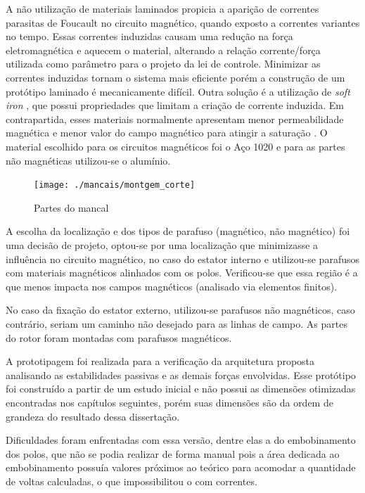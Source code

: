  
A não utilização de materiais laminados propicia a aparição de correntes parasitas de Foucault no circuito magnético, quando exposto a correntes variantes no tempo. Essas correntes induzidas  causam uma redução na força eletromagnética e aquecem o material, alterando a relação corrente/força utilizada como parâmetro para o projeto da lei de controle. Minimizar as correntes induzidas tornam o sistema mais eficiente porém a construção de um protótipo laminado é mecanicamente difícil. Outra solução é a utilização de \textit{soft iron} \citep{Boglietti2003}, que possui propriedades que limitam a criação de corrente induzida. Em contrapartida, esses materiais normalmente apresentam menor permeabilidade magnética e menor valor do campo magnético para atingir a saturação \citep{Han2013a}. O material escolhido para os circuitos magnéticos foi o Aço 1020 e para as partes não magnéticas utilizou-se o alumínio.
  
\begin{figure}[th!]
\centering
\texttt{[image: ./mancais/montgem\_corte]}
\caption{Partes do mancal}
\label{fig:montgem:corte}
\end{figure} 

A escolha da localização e dos tipos de parafuso (magnético, não magnético) foi uma decisão de projeto, optou-se por uma localização que minimizasse a influência no circuito magnético, no caso do estator interno e utilizou-se parafusos com materiais magnéticos alinhados com os polos. Verificou-se que essa região é a que menos impacta nos campos magnéticos (analisado via elementos finitos).

No caso da fixação do estator externo, utilizou-se parafusos não magnéticos, caso contrário, seriam um caminho não desejado para as linhas de campo. As partes do rotor foram montadas com parafusos magnéticos.

A prototipagem foi realizada para a verificação da arquitetura proposta analisando as estabilidades passivas e as demais forças envolvidas. Esse protótipo foi construído a partir de um estudo inicial e não possui as dimensões otimizadas encontradas nos capítulos seguintes, porém suas dimensões são da ordem de grandeza do resultado dessa dissertação.

Dificuldades foram enfrentadas com essa versão, dentre elas a do embobinamento dos polos, que não se podia realizar de forma manual pois a área dedicada ao embobinamento possuía valores próximos ao teórico  para acomodar a quantidade de voltas calculadas, o que impossibilitou o com correntes.


